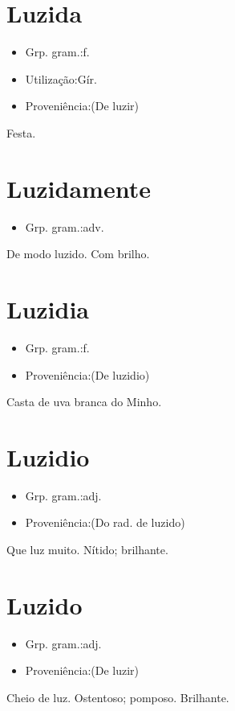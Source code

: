 \section{Luzida}
\begin{itemize}
\item {Grp. gram.:f.}
\end{itemize}
\begin{itemize}
\item {Utilização:Gír.}
\end{itemize}
\begin{itemize}
\item {Proveniência:(De \textunderscore luzir\textunderscore )}
\end{itemize}
Festa.
\section{Luzidamente}
\begin{itemize}
\item {Grp. gram.:adv.}
\end{itemize}
De modo luzido.
Com brilho.
\section{Luzidia}
\begin{itemize}
\item {Grp. gram.:f.}
\end{itemize}
\begin{itemize}
\item {Proveniência:(De \textunderscore luzidio\textunderscore )}
\end{itemize}
Casta de uva branca do Minho.
\section{Luzidio}
\begin{itemize}
\item {Grp. gram.:adj.}
\end{itemize}
\begin{itemize}
\item {Proveniência:(Do rad. de \textunderscore luzido\textunderscore )}
\end{itemize}
Que luz muito.
Nítido; brilhante.
\section{Luzido}
\begin{itemize}
\item {Grp. gram.:adj.}
\end{itemize}
\begin{itemize}
\item {Proveniência:(De \textunderscore luzir\textunderscore )}
\end{itemize}
Cheio de luz.
Ostentoso; pomposo.
Brilhante.
